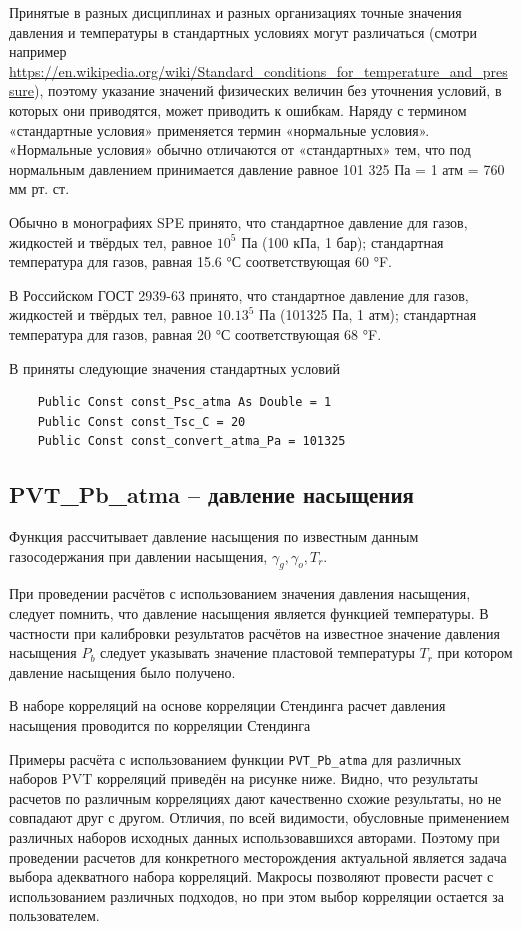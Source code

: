 \documentclass[]{scrreprt}
\begin{document}
Принятые в разных дисциплинах и разных организациях точные значения давления и температуры в стандартных условиях могут различаться (смотри например \url{https://en.wikipedia.org/wiki/Standard_conditions_for_temperature_and_pressure}), поэтому указание значений физических величин без уточнения условий, в которых они приводятся, может приводить к ошибкам. Наряду с термином «стандартные условия» применяется термин «нормальные условия». «Нормальные условия» обычно отличаются от «стандартных» тем, что под нормальным давлением принимается давление равное 101 325 Па = 1 атм = 760 мм рт. ст.

Обычно в монографиях SPE принято, что стандартное давление для газов, жидкостей и твёрдых тел, равное $10^5$ Па (100 кПа, 1 бар); стандартная температура для газов, равная 15.6 °С соответствующая 60 °F. 

В Российском ГОСТ 2939-63  принято, что стандартное давление для газов, жидкостей и твёрдых тел, равное $10.13^5$ Па (101325 Па, 1 атм); стандартная температура для газов, равная 20 °С соответствующая 68 °F. 

В \unf приняты следующие значения стандартных условий

\begin{verbatim}
	Public Const const_Psc_atma As Double = 1
	Public Const const_Tsc_C = 20
	Public Const const_convert_atma_Pa = 101325
\end{verbatim}


\subsection{PVT\_Pb\_atma – давление насыщения}
Функция рассчитывает давление насыщения по известным данным газосодержания при давлении насыщения, $\gamma_g, \gamma_o, T_r$.

При проведении расчётов с использованием значения давления насыщения, следует помнить, что давление насыщения является функцией температуры. В частности при калибровки результатов расчётов на известное значение давления насыщения $P_b$ следует указывать значение пластовой температуры $T_r$ при котором давление насыщения было получено. 

В наборе корреляций на основе корреляции Стендинга расчет давления насыщения проводится по корреляции Стендинга \cite{Yukos_PVT_2002}


Примеры расчёта с использованием функции \texttt{PVT_Pb_atma} для различных наборов PVT корреляций приведён на рисунке ниже. Видно, что результаты расчетов по различным корреляциях дают качественно схожие результаты, но не совпадают друг с другом.  Отличия, по всей видимости,  обусловные применением различных наборов исходных данных использовавшихся авторами. Поэтому при проведении расчетов для конкретного месторождения актуальной является задача выбора адекватного набора корреляций. Макросы \unf позволяют провести расчет с использованием различных подходов, но при этом выбор корреляции остается за пользователем. 
\end{document}
